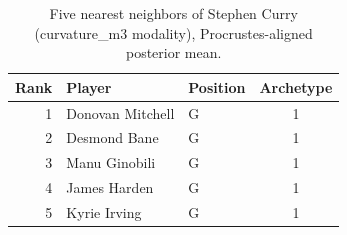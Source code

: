 \begin{table}[htbp]
  \centering\small
  \begin{tabular}{rllc}
    \toprule
    Rank & Player & Position & Archetype \\
    \midrule
    1 & Donovan Mitchell & G & 1 \\
    2 & Desmond Bane & G & 1 \\
    3 & Manu Ginobili & G & 1 \\
    4 & James Harden & G & 1 \\
    5 & Kyrie Irving & G & 1 \\
    \bottomrule
  \end{tabular}
  \caption{Five nearest neighbors of Stephen Curry (curvature_m3 modality), Procrustes-aligned posterior mean.}
  \label{tab:Stephen_Curry_neighbors_curvature_m3}
\end{table}


